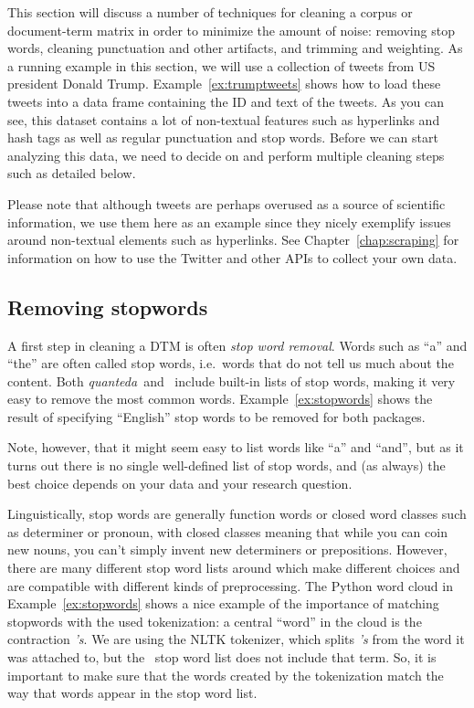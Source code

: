 This section will discuss a number of techniques for cleaning a corpus or document-term matrix in order to minimize the amount of noise: removing stop words, cleaning punctuation and other artifacts, and trimming and weighting.
As a running example in this section, we will use a collection of tweets from US president Donald Trump.
Example~\ref{ex:trumptweets} shows how to load these tweets into a data frame containing the ID and text of the tweets.
As you can see, this dataset contains a lot of non-textual features such as hyperlinks and hash tags as well as regular punctuation and stop words.
Before we can start analyzing this data, we need to decide on and perform multiple cleaning steps such as detailed below.


Please note that although tweets are perhaps overused as a source of scientific information,
we use them here as an example since they nicely exemplify issues around non-textual elements such as hyperlinks.
See Chapter~\ref{chap:scraping} for information on how to use the Twitter and other APIs to collect your own data.

\subsection{Removing stopwords}

A first step in cleaning a DTM is often \emph{stop word removal}.
Words such as ``a'' and ``the'' are often called stop words, i.e.\ words that do not tell us much about the content.
Both \emph{quanteda}\ and \sklearn\ include built-in lists of stop words, making it very easy to remove the most common words.
Example~\ref{ex:stopwords} shows the result of specifying ``English'' stop words to be removed for both packages.




Note, however, that it might seem easy to list words like ``a'' and ``and'',
but as it turns out there is no single well-defined list of stop words,
and (as always) the best choice depends on your data and your research question.

Linguistically, stop words are generally function words or closed word classes such as determiner or pronoun,
with closed classes meaning that while you can coin new nouns, you can't simply invent  new determiners or prepositions.
However, there are many different stop word lists around which make different choices and are compatible with
different kinds of preprocessing.
The Python word cloud in Example~\ref{ex:stopwords} shows a nice example of the importance of matching stopwords with the used
tokenization: a central ``word'' in the cloud is the contraction \emph{'s}.
We are using the NLTK tokenizer, which splits \emph{'s} from the word it was attached to, but the \sklearn\ stop word list
does not include that term.
So, it is important to make sure that the words created by the tokenization match the way that words appear in the stop word list.

